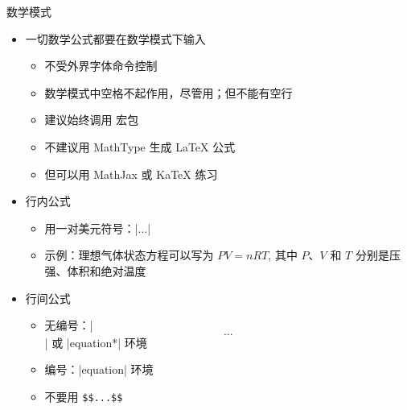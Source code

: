 \begin{frame}[fragile]{数学模式}
\begin{itemize}
  \item 一切数学公式都要在数学模式下输入
    \begin{itemize}
      \item 不受外界字体命令控制
      \item 数学模式中空格不起作用，尽管用；但不能有空行
      \item 建议始终调用  宏包 \pause
      \item \alert{不建议用 MathType 生成 \LaTeX{} 公式}
      \item 但可以用 MathJax  或 Ka\TeX{}  练习
    \end{itemize} \pause

  \item 行内公式
    \begin{itemize}
      \item 用一对美元符号：|$...$|
      \item 示例：理想气体状态方程可以写为 $PV=nRT$, 其中 $P$、$V$ 和 $T$
        分别是压强、体积和绝对温度
    \end{itemize} \pause

  \item 行间公式
    \begin{itemize}
      \item 无编号：|\[...\]| 或 |equation*| 环境
      \item 编号：|equation| 环境
      \item \alert{不要用 \texttt{\$\$...\$\$}} 
    \end{itemize}
\end{itemize}
\end{frame}

